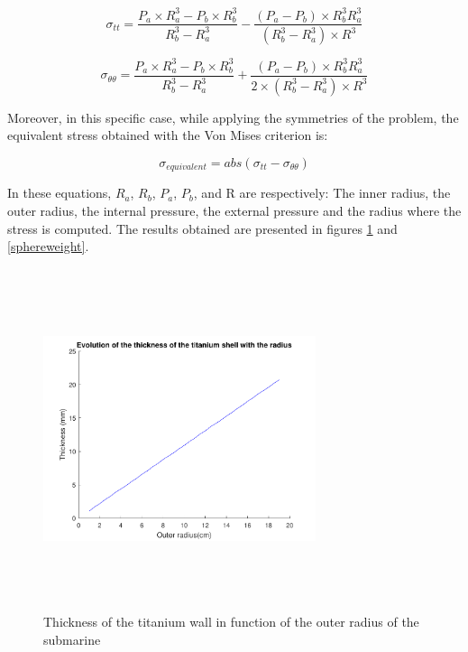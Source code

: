 \begin{equation}
\sigma_{tt}=\frac{P_{a}\times R_{a}^{3}-P_{b}\times R_{b}^{3}}{R_{b}^{3}-R_{a}^{3}}-\frac{(P_{a}-P_{b}) \times R_{b}^{3} R_{a}^{3}}{(R_{b}^{3}-R_{a}^{3}) \times R^{3}}
\end{equation}

\begin{equation}
\sigma_{\theta\theta}=\frac{P_{a}\times R_{a}^{3}-P_{b}\times R_{b}^{3}}{R_{b}^{3}-R_{a}^{3}}+\frac{(P_{a}-P_{b}) \times R_{b}^{3} R_{a}^{3}}{2 \times (R_{b}^{3}-R_{a}^{3}) \times R^{3}}
\end{equation}

Moreover, in this specific case, while applying the symmetries of the problem, the equivalent stress obtained with the Von Mises criterion is:

\begin{equation}
\sigma_{equivalent}= abs(\sigma_{tt}-\sigma_{\theta\theta})
\end{equation}

In these equations, $R_{a}$, $R_{b}$, $P_{a}$, $P_{b}$, and R are respectively: The inner radius, the outer radius, the internal pressure, the external pressure and the radius where the stress is computed. The results obtained are presented in figures \ref{wallthickness} and \ref{sphereweight}.


\begin{figure}[htb]
\centering
\includegraphics[width=8cm, height=10cm, clip]{figures/Paul/Thickness.pdf}
\caption{Thickness of the titanium wall in function of the outer radius of the submarine}
\label{wallthickness}
\end{figure}

